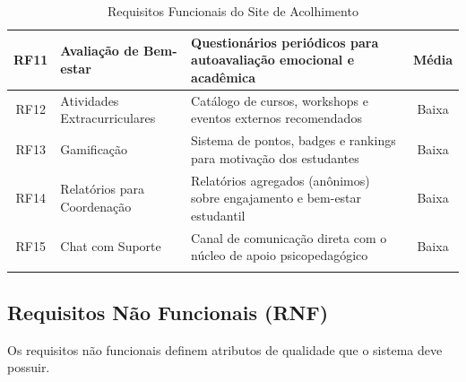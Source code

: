 \documentclass[12pt, a4paper]{article}
\begin{document}
\begin{longtable}{|c|p{4.5cm}|p{6.5cm}|c|}
\rowcolor{reqFunc}
RF11 & Avaliação de Bem-estar & Questionários periódicos para autoavaliação emocional e acadêmica & Média \\
\hline

RF12 & Atividades Extracurriculares & Catálogo de cursos, workshops e eventos externos recomendados & Baixa \\
\hline

\rowcolor{reqFunc}
RF13 & Gamificação & Sistema de pontos, badges e rankings para motivação dos estudantes & Baixa \\
\hline

RF14 & Relatórios para Coordenação & Relatórios agregados (anônimos) sobre engajamento e bem-estar estudantil & Baixa \\
\hline

\rowcolor{reqFunc}
RF15 & Chat com Suporte & Canal de comunicação direta com o núcleo de apoio psicopedagógico & Baixa \\
\hline

\caption{Requisitos Funcionais do Site de Acolhimento}
\label{tab:requisitos-funcionais}
\end{longtable}

\subsection{Requisitos Não Funcionais (RNF)}

Os requisitos não funcionais definem atributos de qualidade que o sistema deve possuir.
\end{document}
